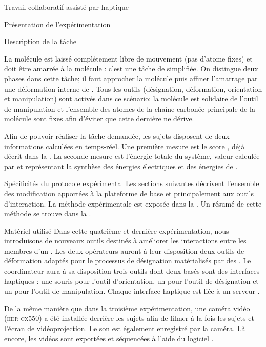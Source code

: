 \documentclass[myfrancais,ngerman,english,frenchb]{mythesis}
\begin{document}
\begin{mychapter}{Travail collaboratif assisté par haptique}
\begin{mysection}{Présentation de l'expérimentation}
\begin{mysubsection}{Description de la tâche}
\begin{description}
						La molécule \myNusG est laissé complétement libre de mouvement (pas d'atome fixes) et doit être amarrée à la molécule \myNusE : c'est une tâche de  simplifiée.
						On distingue deux phases dans cette tâche; il faut approcher la molécule \myNusG puis affiner l'amarrage par une déformation interne de \myNusG.
						Tous les outils (désignation, déformation, orientation et manipulation) sont activés dans ce scénario; la molécule \myNusG est solidaire de l'outil de manipulation et l'ensemble des atomes de la chaîne carbonée principale de la molécule \myNusE sont fixes afin d'éviter que cette dernière ne dérive.
				\end{description}

				Afin de pouvoir réaliser la tâche demandée, les sujets disposent de deux informations calculées en temps-réel.
				Une première mesure est le score , déjà décrit dans la .
				La seconde mesure est l'énergie totale du système, valeur calculée par  et représentant la synthèse des énergies électriques et des énergies de .
			\end{mysubsection}
			\begin{mysubsection}{Spécificités du protocole expérimental}
				Les sections suivantes décrivent l'ensemble des modification apportées à la plateforme de base  et principalement aux outils d'interaction.
				La méthode expérimentale est exposée dans la .
				Un résumé de cette méthode se trouve dans la .
				\begin{mysubsubsection}{Matériel utilisé}
					Dans cette quatrième et dernière expérimentation, nous introduisons de nouveaux outils destinés à améliorer les interactions entre les membres d'un .
					Les deux opérateurs auront à leur disposition deux outils de déformation adaptés pour le processus de désignation  matérialisés par des \myOmni.
					Le coordinateur aura à sa disposition trois outils dont deux basés sont des interfaces haptiques : une souris \myUSB pour l'outil d'orientation, un \myOmni pour l'outil de désignation et un \myDesktop pour l'outil de manipulation.
					Chaque interface haptique est liée à un serveur .

					De la même manière que dans la troisième expérimentation, une caméra vidéo \mySony (\textsc{hdr-cx550}) a été installée derrière les sujets afin de filmer à la fois les sujets et l'écran de vidéoprojection.
					Le son est également enregistré par la caméra.
					Là encore, les vidéos sont exportées et séquencées \myafortiori à l'aide du logiciel \myiMovie.


\end{mysubsubsection}
\end{mysubsection}
\end{mysection}
\end{mychapter}
\end{document}
